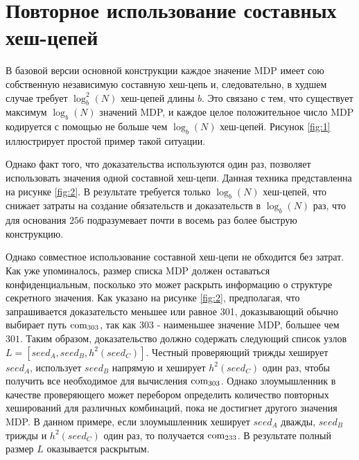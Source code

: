\section{Повторное использование составных хеш-цепей} %
В базовой версии основной конструкции каждое значение MDP имеет сою собственную независимую составную хеш-цепь и, следовательно, в худшем случае требует $\log^2_b(N)$ хеш-цепей длины $b$.
Это связано с тем, что существует максимум $\log_b(N)$ значений MDP, и каждое целое положительное число MDP кодируется с помощью не больше чем $\log_b(N)$ хеш-цепей.
Рисунок \ref{fig:1} иллюстрирует простой пример такой ситуации.

\begin{tikzpicture}[node distance=1.5cm]
	\label{fig:1}
\end{tikzpicture}

Однако факт того, что доказательства используются один раз, позволяет использовать значения одной составной хеш-цепи.
Данная техника представленна на рисунке \ref{fig:2}.
В результате требуется только $\log_b(N)$ хеш-цепей, что снижает затраты на создание обязательств и доказательств в $\log_b(N)$ раз, что для основания $256$ подразумевает почти в восемь раз более быструю конструкцию.

\begin{tikzpicture}[node distance=1.5cm]
	\label{fig:2}
\end{tikzpicture}

Однако совместное использование составной хеш-цепи не обходится без затрат.
Как уже упоминалось, размер списка MDP должен оставаться конфиденциальным, посколько это может раскрыть информацию о структуре секретного значения.
Как указано на рисунке \ref{fig:2}, предполагая, что запрашивается доказательсто меньшее или равное 301, доказывающий обычно выбирает путь $\com_{303}$, так как $303$ - наименьшее значение MDP, большее чем $301$.
Таким образом, доказательство должно содержать следующий список узлов $L = [seed_A, seed_B, h^2(seed_C)]$.
Честный проверяющий трижды хеширует $seed_A$, использует $seed_B$ напрямую и хеширует $h^2(seed_C)$ один раз, чтобы получить все необходимое для вычисления $\com_{303}$.
Однако злоумышленник в качестве проверяющего может перебором определить количество повторных хеширований для различных комбинаций, пока не достигнет другого значения MDP.
В данном примере, если злоумышленник хеширует $seed_A$ дважды, $seed_B$ трижды и $h^2(seed_C)$ один раз, то получается $\com_{233}$.
В результате полный размер $L$ оказывается раскрытым.


